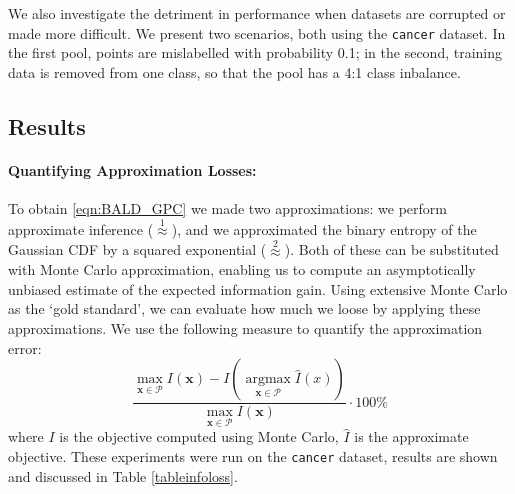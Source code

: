 \documentclass[twoside]{article}
\newcommand{\x}{\bm{x}}
\newcommand{\argmax}{ \operatorname*{arg \max}}
\begin{document}
We also investigate the detriment in performance when datasets are corrupted or made more difficult. We present two scenarios, both using the \texttt{cancer} dataset. In the first pool, points are mislabelled with probability 0.1; in the second, training data is removed from one class, so that the pool has a 4:1 class inbalance.

\subsection{Results}

\paragraph{Quantifying Approximation Losses:} To obtain \eqref{eqn:BALD_GPC} we made two approximations: we perform approximate inference ($\stackrel{1}{\approx}$), and we approximated the binary entropy of the Gaussian CDF by a squared exponential ($\stackrel{2}{\approx}$). Both of these can be substituted with Monte Carlo approximation, enabling us to compute an asymptotically unbiased estimate of the expected information gain. Using extensive Monte Carlo as the `gold standard', we can evaluate how much we loose by applying these approximations. We use the following measure to quantify the approximation error:
\begin{equation}
	\frac{\max_{\x\in\mathcal{P}}I(\x) - I(\argmax_{\x\in\mathcal{P}}\hat{I}(x))}{\max_{\x\in\mathcal{P}}I(\x) }\cdot 100\%
\end{equation}
where $I$ is the objective computed using Monte Carlo, $\hat{I}$ is the approximate objective. These experiments were run on the \texttt{cancer} dataset, results are shown and discussed in Table \ref{tableinfoloss}.
\end{document}
